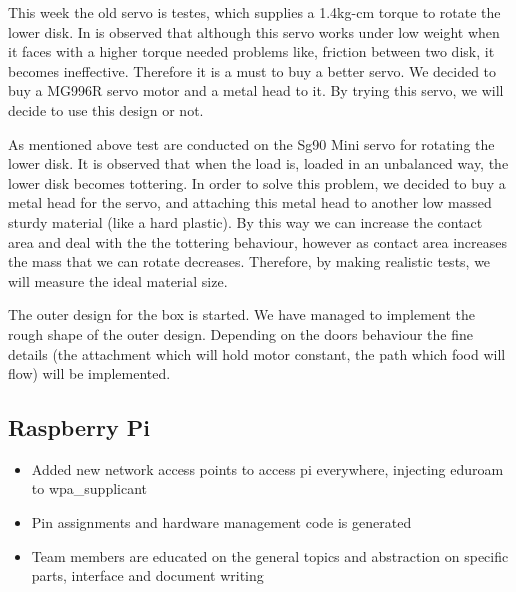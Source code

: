 This week the old servo is testes, which supplies a 1.4kg-cm torque to rotate the lower disk. In is observed that although this servo works under low weight when it faces with a higher torque needed problems like, friction between two disk, it becomes ineffective. Therefore it is a must to buy a better servo. We decided to buy a MG996R servo motor and a metal head to it. By trying this servo, we will decide to use this design or not.

As mentioned above test are conducted on the Sg90 Mini servo for rotating the lower disk. It is observed that when the load is, loaded in an unbalanced way, the lower disk becomes tottering. In order to solve this problem, we decided to buy a metal head for the servo, and attaching this metal head to another low massed sturdy material (like a hard plastic). By this way we can increase the contact area and deal with the the tottering behaviour, however as contact area increases the mass that we can rotate decreases. Therefore, by making realistic tests, we will measure the ideal material size. 

The outer design for the box is started. We have managed to implement the rough shape of the outer design. Depending on the doors behaviour the fine details (the attachment which will hold motor constant, the path which food will flow) will be implemented.

\subsection{Raspberry Pi}
\begin{itemize}
    \item Added new network access points to access pi everywhere, injecting eduroam to wpa\_supplicant
    \item Pin assignments and hardware management code is generated
    \item Team members are educated on the general topics and abstraction on specific parts, interface and document writing
\end{itemize}